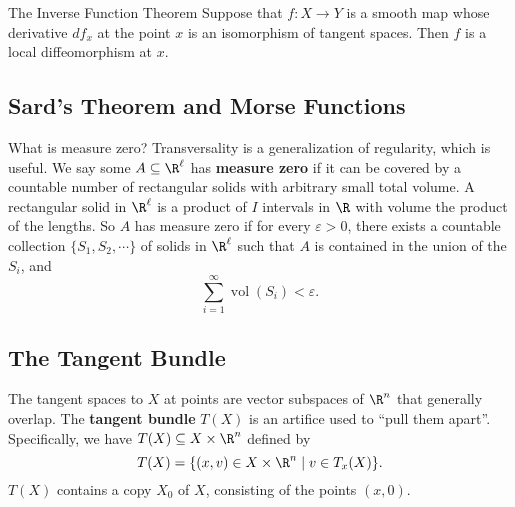 \begin{namedthm}{The Inverse Function Theorem}
  Suppose that $f \colon X \to Y$ is a smooth map whose derivative $df_x$ at the point $x$ is an isomorphism of tangent spaces. Then $f$ is a local diffeomorphism at $x$.
\end{namedthm}

\subsection{Sard's Theorem and Morse Functions}
What is measure zero? Transversality is a generalization of regularity, which is useful. We say some $A \subseteq \R^{\ell}$ has \textbf{measure zero} if it can be covered by a countable number of rectangular solids with arbitrary small total volume. A rectangular solid in $\R^{\ell}$ is a product of $I$ intervals in $\R$ with volume the product of the lengths. So $A$ has measure zero if for every $\varepsilon >0$, there exists a countable collection $\{S_1 ,S_2,\cdots \} $ of solids in $\R^{\ell}$ such that $A$ is contained in the union of the $S_i $, and \[
    \sum_{i=1}^{\infty} \operatorname{vol}(S_i )<\varepsilon .
\] 


\subsection{The Tangent Bundle}
The tangent spaces to $X$ at points are vector subspaces of $\R^n $ that generally overlap. The \textbf{tangent bundle} $T(X)$ is an artifice used to ``pull them apart''. Specifically, we have $T(X) \subseteq X\times \R^n $ defined by \[
    T(X) = \{(x,v) \in X \times \R^n \mid v \in T_x(X)\} .
\] $T(X)$ contains a copy $X_0$ of $X$, consisting of the points $(x,0)$. 

